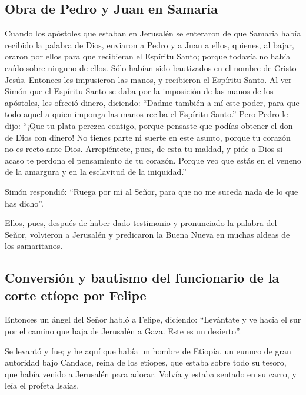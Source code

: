 \begin{paracol}{2}
\hypertarget{obra-de-pedro-y-juan-en-samaria}{%
\subsection{Obra de Pedro y Juan en
Samaria}\label{obra-de-pedro-y-juan-en-samaria}}

 Cuando los apóstoles que estaban en Jerusalén se
enteraron de que Samaria había recibido la palabra de Dios, enviaron a
Pedro y a Juan a ellos,  quienes, al bajar, oraron por
ellos para que recibieran el Espíritu Santo;  porque
todavía no había caído sobre ninguno de ellos. Sólo habían sido
bautizados en el nombre de Cristo Jesús.  Entonces les
impusieron las manos, y recibieron el Espíritu Santo.  Al
ver Simón que el Espíritu Santo se daba por la imposición de las manos
de los apóstoles, les ofreció dinero,  diciendo: ``Dadme
también a mí este poder, para que todo aquel a quien imponga las manos
reciba el Espíritu Santo.''  Pero Pedro le dijo: ``¡Que
tu plata perezca contigo, porque pensaste que podías obtener el don de
Dios con dinero!  No tienes parte ni suerte en este
asunto, porque tu corazón no es recto ante Dios. 
Arrepiéntete, pues, de esta tu maldad, y pide a Dios si acaso te perdona
el pensamiento de tu corazón.  Porque veo que estás en el
veneno de la amargura y en la esclavitud de la iniquidad.''

 Simón respondió: ``Ruega por mí al Señor, para que no me
suceda nada de lo que has dicho''.

 Ellos, pues, después de haber dado testimonio y
pronunciado la palabra del Señor, volvieron a Jerusalén y predicaron la
Buena Nueva en muchas aldeas de los samaritanos.

\hypertarget{conversiuxf3n-y-bautismo-del-funcionario-de-la-corte-etuxedope-por-felipe}{%
\subsection{Conversión y bautismo del funcionario de la corte etíope por
Felipe}\label{conversiuxf3n-y-bautismo-del-funcionario-de-la-corte-etuxedope-por-felipe}}

 Entonces un ángel del Señor habló a Felipe, diciendo:
``Levántate y ve hacia el sur por el camino que baja de Jerusalén a
Gaza. Este es un desierto''.

 Se levantó y fue; y he aquí que había un hombre de
Etiopía, un eunuco de gran autoridad bajo Candace, reina de los etíopes,
que estaba sobre todo su tesoro, que había venido a Jerusalén para
adorar.  Volvía y estaba sentado en su carro, y leía el
profeta Isaías.


\end{paracol}
